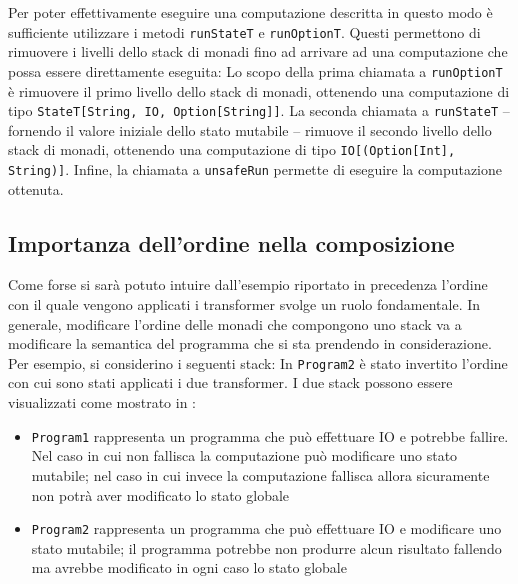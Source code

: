 Per poter effettivamente eseguire una computazione descritta in questo modo è sufficiente utilizzare i metodi \lstinline{runStateT} e \lstinline{runOptionT}. Questi permettono di rimuovere i livelli dello stack di monadi fino ad arrivare ad una computazione che possa essere direttamente eseguita:
Lo scopo della prima chiamata a \lstinline{runOptionT} è rimuovere il primo livello dello stack di monadi, ottenendo una computazione di tipo \lstinline{StateT[String, IO, Option[String]]}. La seconda chiamata a \lstinline{runStateT} -- fornendo il valore iniziale dello stato mutabile -- rimuove il secondo livello dello stack di monadi, ottenendo una computazione di tipo \lstinline{IO[(Option[Int], String)]}. Infine, la chiamata a \lstinline{unsafeRun} permette di eseguire la computazione ottenuta.

\subsection{Importanza dell'ordine nella composizione}
Come forse si sarà potuto intuire dall'esempio riportato in precedenza l'ordine con il quale vengono applicati i transformer svolge un ruolo fondamentale. In generale, modificare l'ordine delle monadi che compongono uno stack va a modificare la semantica del programma che si sta prendendo in considerazione. Per esempio, si considerino i seguenti stack:
In \lstinline{Program2} è stato invertito l'ordine con cui sono stati applicati i due transformer. I due stack possono essere visualizzati come mostrato in :
\begin{itemize}
  \item \lstinline{Program1} rappresenta un programma che può effettuare IO e potrebbe fallire. Nel caso in cui non fallisca la computazione può modificare uno stato mutabile; nel caso in cui invece la computazione fallisca allora sicuramente non potrà aver modificato lo stato globale
  \item \lstinline{Program2} rappresenta un programma che può effettuare IO e modificare uno stato mutabile; il programma potrebbe non produrre alcun risultato fallendo ma avrebbe modificato in ogni caso lo stato globale
\end{itemize}



